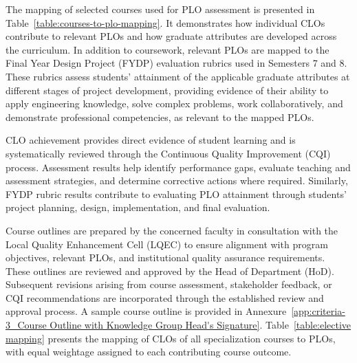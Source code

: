 The mapping of selected courses used for PLO assessment is presented in Table~\ref{table:courses-to-plo-mapping}. It demonstrates how individual CLOs contribute to relevant PLOs and how graduate attributes are developed across the curriculum. In addition to coursework, relevant PLOs are mapped to the Final Year Design Project (FYDP) evaluation rubrics used in Semesters 7 and 8. These rubrics assess students' attainment of the applicable graduate attributes at different stages of project development, providing evidence of their ability to apply engineering knowledge, solve complex problems, work collaboratively, and demonstrate professional competencies, as relevant to the mapped PLOs.

CLO achievement provides direct evidence of student learning and is systematically reviewed through the Continuous Quality Improvement (CQI) process. Assessment results help identify performance gaps, evaluate teaching and assessment strategies, and determine corrective actions where required. Similarly, FYDP rubric results contribute to evaluating PLO attainment through students' project planning, design, implementation, and final evaluation.

Course outlines are prepared by the concerned faculty in consultation with the Local Quality Enhancement Cell (LQEC) to ensure alignment with program objectives, relevant PLOs, and institutional quality assurance requirements. These outlines are reviewed and approved by the Head of Department (HoD). Subsequent revisions arising from course assessment, stakeholder feedback, or CQI recommendations are incorporated through the established review and approval process. A sample course outline is provided in Annexure~\ref{app:criteria-3_Course Outline with Knowledge Group Head's Signature}. Table~\ref{table:elective mapping} presents the mapping of CLOs of all specialization courses to PLOs, with equal weightage assigned to each contributing course outcome.

